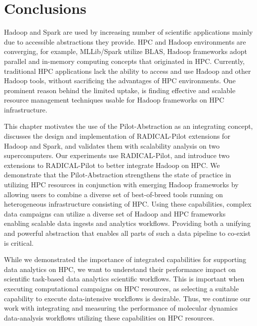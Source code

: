 \section{Conclusions}
\label{sec:hpc_hadoop_concl}
Hadoop and Spark are used by increasing number of scientific applications mainly due to accessible abstractions they provide.
HPC and Hadoop environments are converging, for example, MLLib/Spark utilize BLAS, Hadoop frameworks adopt parallel and in-memory computing concepts that originated in HPC.
Currently, traditional HPC applications lack the ability to access and use Hadoop and other Hadoop tools, without sacrificing the advantages of HPC environments.
One prominent reason behind the limited uptake, is finding effective and scalable resource management techniques usable for Hadoop frameworks on HPC infrastructure.

This chapter motivates the use of the Pilot-Abstraction as an integrating concept, discusses the design and implementation of RADICAL-Pilot extensions for Hadoop and Spark, and validates them with scalability analysis on two supercomputers.
Our experiments use RADICAL-Pilot, and introduce two extensions to RADICAL-Pilot to better integrate Hadoop on HPC.
We demonstrate that the Pilot-Abstraction strengthens the state of practice in utilizing HPC resources in conjunction with emerging Hadoop frameworks by allowing users to combine a diverse set of best-of-breed tools running on heterogeneous infrastructure consisting of HPC.
Using these capabilities, complex data campaigns can utilize a diverse set of Hadoop and HPC frameworks enabling scalable data ingests and analytics workflows.
Providing both a unifying and powerful abstraction that enables all parts of such a data pipeline to co-exist is critical.

While we demonstrated the importance of integrated capabilities for supporting data analytics on HPC, we want to understand their performance impact on scientific task-based data analytics scientific workflows.
This is important when executing computational campaigns on HPC resources, as selecting a suitable capability to execute data-intensive workflows is desirable.
Thus, we continue our work with integrating and measuring the performance of molecular dynamics data-analysis workflows utilizing these capabilities on HPC resources.

